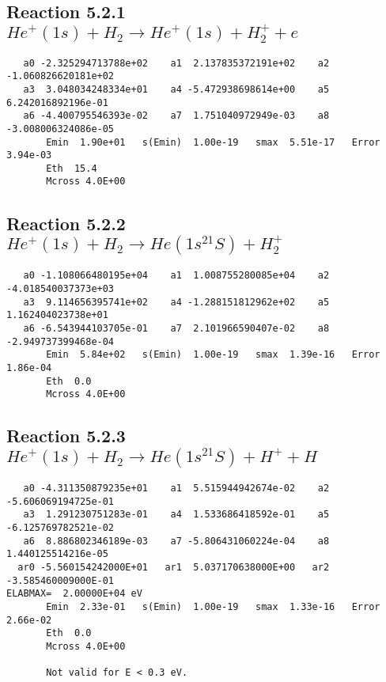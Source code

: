\documentclass[12pt,dvipdfm]{article}
\begin{document}
\newpage
\subsection{
Reaction 5.2.1 $   He^+(1s) + H_2 \rightarrow He^+(1s) + H_2^+ + e$}


\begin{small}\begin{verbatim}
   a0 -2.325294713788e+02    a1  2.137835372191e+02    a2 -1.060826620181e+02
   a3  3.048034248334e+01    a4 -5.472938698614e+00    a5  6.242016892196e-01
   a6 -4.400795546393e-02    a7  1.751040972949e-03    a8 -3.008006324086e-05
       Emin  1.90e+01   s(Emin)  1.00e-19   smax  5.51e-17   Error  3.94e-03
       Eth  15.4
       Mcross 4.0E+00

\end{verbatim}\end{small}

\newpage
\subsection{
Reaction 5.2.2 $   He^+(1s) + H_2 \rightarrow He(1s^21S) + H_2^+$}


\begin{small}\begin{verbatim}
   a0 -1.108066480195e+04    a1  1.008755280085e+04    a2 -4.018540037373e+03
   a3  9.114656395741e+02    a4 -1.288151812962e+02    a5  1.162404023738e+01
   a6 -6.543944103705e-01    a7  2.101966590407e-02    a8 -2.949737399468e-04
       Emin  5.84e+02   s(Emin)  1.00e-19   smax  1.39e-16   Error  1.86e-04
       Eth  0.0
       Mcross 4.0E+00
\end{verbatim}\end{small}

\newpage
\subsection{
Reaction 5.2.3 $   He^+(1s) + H_2 \rightarrow He(1s^21S) + H^+ + H$}


\begin{small}\begin{verbatim}
   a0 -4.311350879235e+01    a1  5.515944942674e-02    a2 -5.606069194725e-01
   a3  1.291230751283e-01    a4  1.533686418592e-01    a5 -6.125769782521e-02
   a6  8.886802346189e-03    a7 -5.806431060224e-04    a8  1.440125514216e-05
  ar0 -5.560154242000E+01   ar1  5.037170638000E+00   ar2 -3.585460009000E-01
ELABMAX=  2.00000E+04 eV
       Emin  2.33e-01   s(Emin)  1.00e-19   smax  1.33e-16   Error  2.66e-02
       Eth  0.0
       Mcross 4.0E+00

       Not valid for E < 0.3 eV.
\end{verbatim}\end{small}
\end{document}
